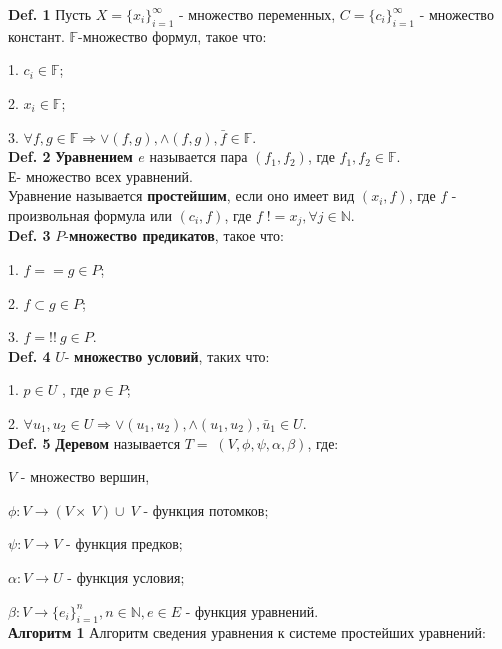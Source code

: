 \documentclass[12pt]{article}
\begin{document}
 
	{\bf Def. 1} Пусть $X = \lbrace  x_{i}  \rbrace_{i=1}^{\infty} $ - множество переменных,
	$C = \lbrace  c_{i}  \rbrace_{i=1}^{\infty} $ - множество констант. $\mathbb{F}$-множество формул, такое что:
	
	1. $c_{i} \in \mathbb{F} $; 
	
	2. $x_{i} \in \mathbb{F} $; 
	
	3. $\forall f, g \in \mathbb{F} \Rightarrow \vee(f,g), \wedge(f,g), \bar f \in \mathbb{F}$.
	\\

	{\bf Def. 2} {\bf Уравнением  $e$} называется пара $(f_{1},f_{2})$, где $f_{1},f_{2} \in \mathbb{F}$.\\Е- множество всех уравнений.
	\\Уравнение называется {\bf простейшим}, если оно имеет вид $(x_{i}, f)$, где $f$ - произвольная формула или $(c_{i}, f)$, где $f \; != x_{j}, \forall j \in \mathbb{N}$.
	\\
	
	{\bf Def. 3} $P$-{\bf множество предикатов}, такое что: 
	
	1. $f==g \in P$; 
	
    2. $f \subset g \in P$;
    
    3. $f =!! \: g \in P$.
    \\
    
    {\bf Def. 4}  $U$- {\bf множество условий}, таких что: 
    
    1. $p \in U$ , где $p \in P$;
    
    2. $\forall u_{1}, u_{2} \in U \Rightarrow \vee(u_{1},u_{2}), \wedge(u_{1},u_{2}), \bar u_{1} \in U$.
    \\
    
     \hypertarget{d5}{{\bf Def. 5}} {\bf Деревом} называется $T = \; (V,\phi,\psi, \alpha, \beta)$, где: 
     
     $V$ - множество вершин,
     
      $\phi : V \rightarrow (V\times \:V)\cup \:V$ - функция потомков;
      
      $\psi : V \rightarrow V$ - функция предков;
      
      $\alpha : V \rightarrow U$ - функция условия;
      
      $\beta : V \rightarrow \lbrace  e_{i}  \rbrace_{i=1}^{n}, n \in \mathbb{N}, e \in E $ - функция уравнений.
     \\
     
     \hypertarget{a1}{{\bf Алгоритм 1}}
     Алгоритм сведения уравнения к системе простейших уравнений:
     
\end{document}
